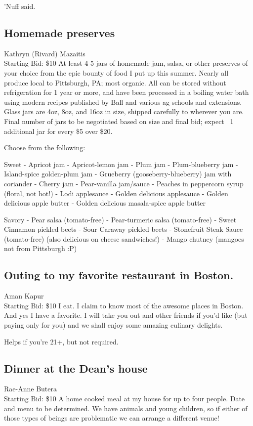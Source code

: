 \documentclass[11pt]{article}
\begin{document}
'Nuff said.
\subsection{Homemade preserves}
Kathryn (Rivard) Mazaitis
\\
Starting Bid: \$10
\newline
At least 4-5 jars of homemade jam, salsa, or other preserves of your choice from the epic bounty of food I put up this summer. Nearly all produce local to Pittsburgh, PA; most organic. All can be stored without refrigeration for 1 year or more, and have been processed in a boiling water bath using modern recipes published by Ball and various ag schools and extensions. Glass jars are 4oz, 8oz, and 16oz in size, shipped carefully to wherever you are. Final number of jars to be negotiated based on size and final bid; expect ~1 additional jar for every \$5 over \$20.

Choose from the following:

Sweet
- Apricot jam
- Apricot-lemon jam
- Plum jam
- Plum-blueberry jam
- Island-spice golden-plum jam
- Grueberry (gooseberry-blueberry) jam with coriander
- Cherry jam
- Pear-vanilla jam/sauce
- Peaches in peppercorn syrup (floral, not hot!)
- Lodi applesauce
- Golden delicious applesauce
- Golden delicious apple butter
- Golden delicious masala-spice apple butter

Savory
- Pear salsa (tomato-free)
- Pear-turmeric salsa (tomato-free)
- Sweet Cinnamon pickled beets
- Sour Caraway pickled beets
- Stonefruit Steak Sauce (tomato-free) (also delicious on cheese sandwiches!)
- Mango chutney (mangoes not from Pittsburgh :P)
\subsection{Outing to my favorite restaurant in Boston. }
Aman Kapur
\\
Starting Bid: \$10
\newline
I eat. I claim to know most of the awesome places in Boston. And yes I have a favorite. I will take you out and other friends if you'd like (but paying only for you) and we shall enjoy some amazing culinary delights. 

Helps if you're 21+, but not required.
\subsection{Dinner at the Dean's house}
Rae-Anne Butera
\\
Starting Bid: \$10
\newline
A home cooked meal at my house for up to four people. Date and menu to be determined. We have animals and young children, so if either of those types of beings are problematic we can arrange a different venue!
\end{document}
